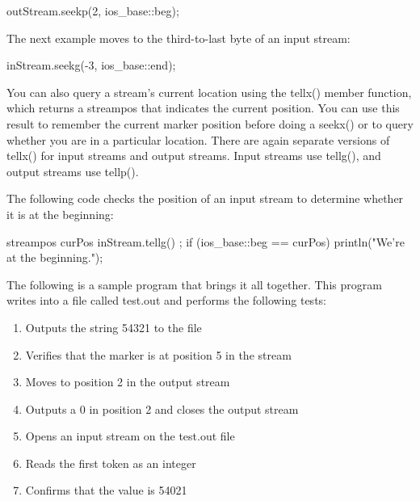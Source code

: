 \begin{cpp}
outStream.seekp(2, ios_base::beg);
\end{cpp}

The next example moves to the third-to-last byte of an input stream:

\begin{cpp}
inStream.seekg(-3, ios_base::end);
\end{cpp}

You can also query a stream’s current location using the tellx() member function, which returns a streampos that indicates the current position. You can use this result to remember the current marker position before doing a seekx() or to query whether you are in a particular location. There are again separate versions of tellx() for input streams and output streams. Input streams use tellg(), and output streams use tellp().

The following code checks the position of an input stream to determine whether it is at the beginning:

\begin{cpp}
streampos curPos { inStream.tellg() };
if (ios_base::beg == curPos) {
    println("We're at the beginning.");
}
\end{cpp}

The following is a sample program that brings it all together. This program writes into a file called test.out and performs the following tests:

\begin{enumerate}
\item
Outputs the string 54321 to the file

\item
Verifies that the marker is at position 5 in the stream

\item
Moves to position 2 in the output stream

\item
Outputs a 0 in position 2 and closes the output stream

\item
Opens an input stream on the test.out file

\item
Reads the first token as an integer

\item
Confirms that the value is 54021
\end{enumerate}

